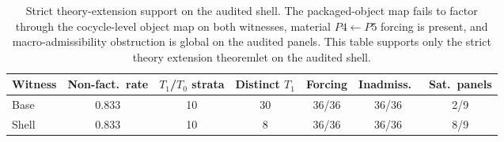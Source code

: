 \begin{table}[t]
\caption{Strict theory-extension support on the audited shell.
The packaged-object map fails to factor through the cocycle-level object map
on both witnesses, material $P4\!\leftarrow\!P5$ forcing is present,
and macro-admissibility obstruction is global on the audited panels.
This table supports only the strict theory extension theoremlet
on the audited shell.}
\label{tbl:strict-theory-extension}
\centering
\small
\begin{tabular}{@{}l c c c c c c@{}}
\toprule
Witness & Non-fact.\ rate & $T_1$/$T_0$ strata & Distinct $T_1$ & Forcing & Inadmiss.\ & Sat.\ panels \\
\midrule
Base  & 0.833 & 10 & 30 & 36/36 & 36/36 & 2/9 \\
Shell & 0.833 & 10 &  8 & 36/36 & 36/36 & 8/9 \\
\bottomrule
\end{tabular}
\end{table}
